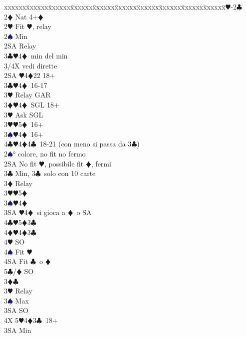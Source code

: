 \documentclass[a4paper,italian]{article}
\newcommand{\BC}{\textcolor{OliveGreen}{$\clubsuit$}}
\newcommand{\BD}{\textcolor{RedOrange}{$\vardiamondsuit$}}
\newcommand{\BH}{\textcolor{Red2}{$\varheartsuit${}}}
\newcommand{\BS}{\textcolor{MidnightBlue}{$\spadesuit${}}}
\newenvironment{bidtable}
{\begin{tabbing}

    xxxxxx\=xxxxxx\=xxxxxx\=xxxxxx\=xxxxxx\=xxxxxx\=xxxxxx\=xxxxxx\=xxxxxx\=xxxxxx\=\kill}
{\end{tabbing} }%
\begin{document}
\begin{multicols}{2}
    \begin{bidtable}
        1\BH-2\BC\\
        2\BD \> Nat 4+\BD \+\\
        2\BH \> Fit \BH , relay\+\\
        2\BS \> Min\+\\
        2SA \> Relay\+\\
        3\BC {}\BH 4\BD\ min del min\\
        3/4X \> vedi dirette\-\-\\
        2SA \BH 4\BD 22 18+\\
        3\BC {}\BH 4\BD\ 16-17\+\\
        3\BH \> Relay GAR\-\\
        3\BD {}\BH 4\BD\ SGL 18+\+\\
        3\BH \> Ask SGL\-\\
        3\BH {}\BH 5\BD\ 16+\\
        3\BS {}\BH 4\BD\ 16+\\
        4\BC {}\BH 4\BD 4\BC\ 18-21 (con meno si passa da 3\BC )\-\\
        2\BS {}° colore, no fit no fermo\\
        2SA \> No fit \BH , possibile fit \BD , fermi\+\\
        3\BC \> Min, 3\BC\ solo con 10 carte\+\\
        3\BD \> Relay\+\\
        3\BH {}\BH 5\BD \\
        3\BS {}\BH 4\BD \\
        3SA \BH 4\BD\ si gioca a \BD\ o SA\\
        4\BC {}\BH 5\BD 3\BC \\
        4\BD {}\BH 4\BD 3\BC \+\\
        4\BH \> SO\\
        4\BS \> Fit \BH \\
        4SA \> Fit \BC\ o \BD \\
        5\BC/\BD \> SO\-\-\-\\
        3\BD {}\BC \+\\
        3\BH \> Relay\+\\
        3\BS \> Max\+\\
        3SA \> SO\+\\
        4X 5\BH 4\BD 3\BC\ 18+\-\-\\
        3SA \> Min\\

\end{bidtable}
\end{multicols}
\end{document}
